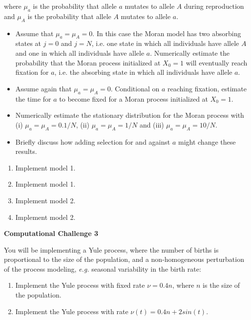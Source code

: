 \documentclass[12pt]{article}
\begin{document}
where $\mu_a$ is the probability that allele $a$ mutates to allele $A$ during reproduction and $\mu_A$ is the probability that allele $A$ mutates to allele $a$.   

\begin{itemize}
\item Assume that $\mu_a=\mu_A=0$. In this case the Moran model has two absorbing states at $j=0$ and $j=N$, i.e. one state in which all individuals have allele $A$ and one in which all individuals have allele $a$. Numerically estimate the probability that the Moran process initialized at $X_0=1$ will eventually reach fixation for $a$, i.e. the absorbing state in which all individuals have allele $a$.
\item Assume again that $\mu_a=\mu_A=0$. Conditional on $a$ reaching fixation, estimate the time for $a$ to become fixed for a Moran process initialized at $X_0=1$.
\item Numerically estimate the stationary distribution for the Moran process with (i) $\mu_a=\mu_A=0.1/N$,  (ii) $\mu_a=\mu_A=1/N$ and  (iii) $\mu_a=\mu_A=10/N$.
\item Briefly discuss how adding selection for and against $a$ might change these results.
\end{itemize}

\begin{enumerate}
\item[\bf Group 1] Implement model 1.
\item[\bf Group 2] Implement model 1.
\item[\bf Group 3] Implement model 2.
\item[\bf Group 4] Implement model 2.
\end{enumerate}


\begin{center}
{\Large \bf Computational Challenge 3
\\ \vskip5mm  }
\end{center}

You will be implementing a Yule process, where the number of births is proportional to the size of the population, and a non-homogeneous perturbation of the process modeling, \emph{e.g.} seasonal variability in the birth rate:

\begin{enumerate}
	\item Implement the Yule process with fixed rate $\nu = 0.4n$, where $n$ is the size of the population.
	\item Implement the Yule process with rate $\nu (t) = 0.4n + 2 sin(t)$.
\end{enumerate}
\end{document}
